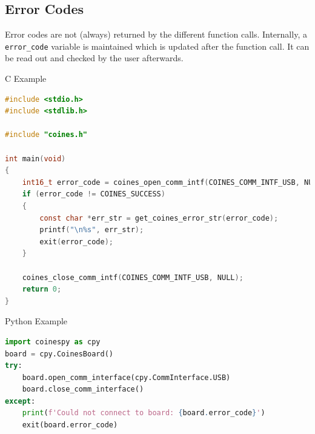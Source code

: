 \documentclass[11pt,headings=small]{scrartcl}
\begin{document}
\newpage


\newpage


\newpage
\subsection{Error Codes}

Error codes are not (always) returned by the different function calls. Internally, a \texttt{error\_code} variable is maintained which is updated after the function call. It can be read out and checked by the user afterwards.

C Example
\begin{lstlisting}[language=c]
#include <stdio.h>
#include <stdlib.h>

#include "coines.h"

int main(void)
{
    int16_t error_code = coines_open_comm_intf(COINES_COMM_INTF_USB, NULL);
    if (error_code != COINES_SUCCESS)
    {
        const char *err_str = get_coines_error_str(error_code);
        printf("\n%s", err_str);
        exit(error_code);
    }

    coines_close_comm_intf(COINES_COMM_INTF_USB, NULL);
    return 0;
}
\end{lstlisting}

Python Example
\begin{lstlisting}[language=python]
import coinespy as cpy
board = cpy.CoinesBoard()
try:
	board.open_comm_interface(cpy.CommInterface.USB)
	board.close_comm_interface()
except:
	print(f'Could not connect to board: {board.error_code}')
	exit(board.error_code)
\end{lstlisting}
\end{document}
